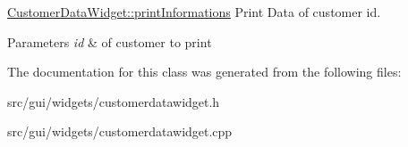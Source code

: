 \hyperlink{classGui_1_1Widgets_1_1CustomerDataWidget_aa995ed95c5ca119db4258af2fe403691}{Customer\+Data\+Widget\+::print\+Informations} Print Data of customer id. 


\begin{DoxyParams}{Parameters}
{\em id} & of customer to print \\
\hline
\end{DoxyParams}


The documentation for this class was generated from the following files\+:\begin{DoxyCompactItemize}
\item 
src/gui/widgets/customerdatawidget.\+h\item 
src/gui/widgets/customerdatawidget.\+cpp\end{DoxyCompactItemize}
